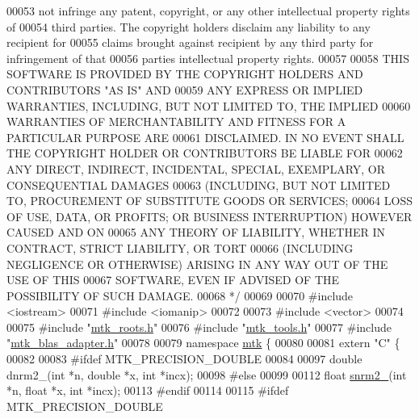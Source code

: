 \begin{DoxyCode}
00053 \textcolor{comment}{not infringe any patent, copyright, or any other intellectual property rights of}
00054 \textcolor{comment}{third parties. The copyright holders disclaim any liability to any recipient for}
00055 \textcolor{comment}{claims brought against recipient by any third party for infringement of that}
00056 \textcolor{comment}{parties intellectual property rights.}
00057 \textcolor{comment}{}
00058 \textcolor{comment}{THIS SOFTWARE IS PROVIDED BY THE COPYRIGHT HOLDERS AND CONTRIBUTORS "AS IS" AND}
00059 \textcolor{comment}{ANY EXPRESS OR IMPLIED WARRANTIES, INCLUDING, BUT NOT LIMITED TO, THE IMPLIED}
00060 \textcolor{comment}{WARRANTIES OF MERCHANTABILITY AND FITNESS FOR A PARTICULAR PURPOSE ARE}
00061 \textcolor{comment}{DISCLAIMED. IN NO EVENT SHALL THE COPYRIGHT HOLDER OR CONTRIBUTORS BE LIABLE FOR}
00062 \textcolor{comment}{ANY DIRECT, INDIRECT, INCIDENTAL, SPECIAL, EXEMPLARY, OR CONSEQUENTIAL DAMAGES}
00063 \textcolor{comment}{(INCLUDING, BUT NOT LIMITED TO, PROCUREMENT OF SUBSTITUTE GOODS OR SERVICES;}
00064 \textcolor{comment}{LOSS OF USE, DATA, OR PROFITS; OR BUSINESS INTERRUPTION) HOWEVER CAUSED AND ON}
00065 \textcolor{comment}{ANY THEORY OF LIABILITY, WHETHER IN CONTRACT, STRICT LIABILITY, OR TORT}
00066 \textcolor{comment}{(INCLUDING NEGLIGENCE OR OTHERWISE) ARISING IN ANY WAY OUT OF THE USE OF THIS}
00067 \textcolor{comment}{SOFTWARE, EVEN IF ADVISED OF THE POSSIBILITY OF SUCH DAMAGE.}
00068 \textcolor{comment}{*/}
00069 
00070 \textcolor{preprocessor}{#include <iostream>}
00071 \textcolor{preprocessor}{#include <iomanip>}
00072 
00073 \textcolor{preprocessor}{#include <vector>}
00074 
00075 \textcolor{preprocessor}{#include "\hyperlink{mtk__roots_8h}{mtk\_roots.h}"}
00076 \textcolor{preprocessor}{#include "\hyperlink{mtk__tools_8h}{mtk\_tools.h}"}
00077 \textcolor{preprocessor}{#include "\hyperlink{mtk__blas__adapter_8h}{mtk\_blas\_adapter.h}"}
00078 
00079 \textcolor{keyword}{namespace }\hyperlink{namespacemtk}{mtk} \{
00080 
00081 \textcolor{keyword}{extern} \textcolor{stringliteral}{"C"} \{
00082 
00083 \textcolor{preprocessor}{#ifdef MTK\_PRECISION\_DOUBLE}
00084 
00097 \textcolor{keywordtype}{double} dnrm2\_(\textcolor{keywordtype}{int} *n, \textcolor{keywordtype}{double} *x, \textcolor{keywordtype}{int} *incx);
00098 \textcolor{preprocessor}{#else}
00099 
00112 \textcolor{keywordtype}{float} \hyperlink{namespacemtk_a508e99fcb14d526bc43aa0a80aa4b658}{snrm2\_}(\textcolor{keywordtype}{int} *n, \textcolor{keywordtype}{float} *x, \textcolor{keywordtype}{int} *incx);
00113 \textcolor{preprocessor}{#endif}
00114 
00115 \textcolor{preprocessor}{#ifdef MTK\_PRECISION\_DOUBLE}

\end{DoxyCode}
